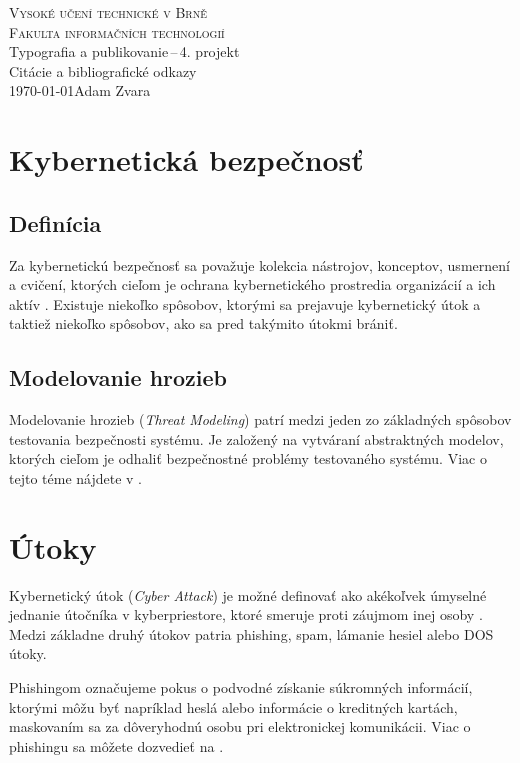 \documentclass{article}
\begin{document}
\begin{titlepage}
\begin{center}
    \Huge
    \textsc{Vysoké učení technické v Brně\\
    \huge
    Fakulta informačních technologií}\\
    \LARGE
    Typografia a publikovanie\,--\,4. projekt\\
    \Huge
    Citácie a bibliografické odkazy\\
    \Large
    \today \hfill Adam Zvara
\end{center}
\end{titlepage}

\section{Kybernetická bezpečnosť}

\subsection{Definícia}
Za kybernetickú bezpečnosť sa považuje kolekcia nástrojov, konceptov, usmernení a cvičení, ktorých cieľom je ochrana kybernetického prostredia organizácií a ich aktív \cite{Schatz2017}. Existuje niekoľko spôsobov, ktorými sa prejavuje kybernetický útok a taktiež niekoľko spôsobov, ako sa pred takýmito útokmi brániť.

\subsection{Modelovanie hrozieb}
Modelovanie hrozieb (\emph{Threat Modeling}) patrí medzi jeden zo základných spôsobov testovania bezpečnosti systému. Je založený na vytváraní abstraktných modelov, ktorých cieľom je odhaliť bezpečnostné problémy testovaného systému. Viac o tejto téme nájdete v \cite{Shostack2014}.

\section{Útoky}
Kybernetický útok (\emph{Cyber Attack}) je možné definovať ako akékoľvek úmyselné jednanie útočníka v kyberpriestore, ktoré smeruje proti záujmom inej osoby \cite{Kolouch2019}. Medzi základne druhý útokov patria phishing, spam, lámanie hesiel alebo DOS útoky.

Phishingom označujeme pokus o podvodné získanie súkromných informácií, ktorými môžu byť napríklad heslá alebo informácie o kreditných kartách, maskovaním sa za dôveryhodnú osobu pri elektronickej komunikácii. Viac o phishingu sa môžete dozvedieť na \cite{wiki:Phishing}.
\end{document}
